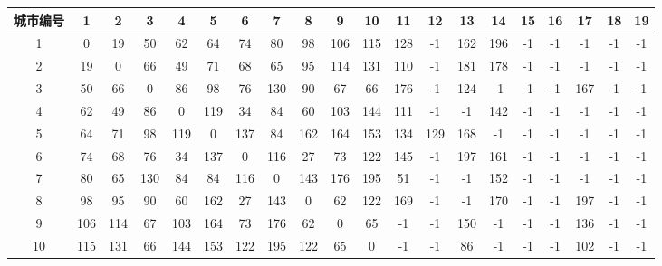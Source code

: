 \documentclass[UTF8,12pt]{ctexart}
\begin{document}
\begin{enumerate}
\begin{itemize}
\begin{table}[H]
{\begin{scriptsize}
                                \begin{tabular}{cccccccccccccccccccc}
                                    \toprule
                                    城市编号 & 1   & 2   & 3   & 4   & 5   & 6   & 7   & 8   & 9   & 10  & 11  & 12  & 13  & 14  & 15 & 16  & 17  & 18  & 19  \\
                                    \midrule
                                    1    & 0   & 19  & 50  & 62  & 64  & 74  & 80  & 98  & 106 & 115 & 128 & -1  & 162 & 196 & -1 & -1  & -1  & -1  & -1  \\
                                    \midrule
                                    2    & 19  & 0   & 66  & 49  & 71  & 68  & 65  & 95  & 114 & 131 & 110 & -1  & 181 & 178 & -1 & -1  & -1  & -1  & -1  \\
                                    \midrule
                                    3    & 50  & 66  & 0   & 86  & 98  & 76  & 130 & 90  & 67  & 66  & 176 & -1  & 124 & -1  & -1 & -1  & 167 & -1  & -1  \\
                                    \midrule
                                    4    & 62  & 49  & 86  & 0   & 119 & 34  & 84  & 60  & 103 & 144 & 111 & -1  & -1  & 142 & -1 & -1  & -1  & -1  & -1  \\
                                    \midrule
                                    5    & 64  & 71  & 98  & 119 & 0   & 137 & 84  & 162 & 164 & 153 & 134 & 129 & 168 & -1  & -1 & -1  & -1  & -1  & -1  \\
                                    \midrule
                                    6    & 74  & 68  & 76  & 34  & 137 & 0   & 116 & 27  & 73  & 122 & 145 & -1  & 197 & 161 & -1 & -1  & -1  & -1  & -1  \\
                                    \midrule
                                    7    & 80  & 65  & 130 & 84  & 84  & 116 & 0   & 143 & 176 & 195 & 51  & -1  & -1  & 152 & -1 & -1  & -1  & -1  & -1  \\
                                    \midrule
                                    8    & 98  & 95  & 90  & 60  & 162 & 27  & 143 & 0   & 62  & 122 & 169 & -1  & -1  & 170 & -1 & -1  & 197 & -1  & -1  \\
                                    \midrule
                                    9    & 106 & 114 & 67  & 103 & 164 & 73  & 176 & 62  & 0   & 65  & -1  & -1  & 150 & -1  & -1 & -1  & 136 & -1  & -1  \\
                                    \midrule
                                    10   & 115 & 131 & 66  & 144 & 153 & 122 & 195 & 122 & 65  & 0   & -1  & -1  & 86  & -1  & -1 & -1  & 102 & -1  & -1  \\

\end{tabular}
\end{scriptsize}}
\end{table}
\end{itemize}
\end{enumerate}
\end{document}
